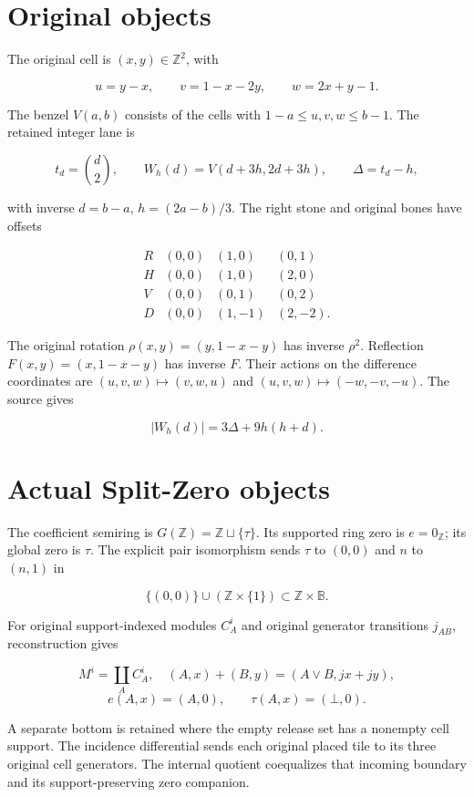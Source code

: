 \documentclass[
  10pt,
]{scrreprt}
\begin{document}
\section{Original objects}\label{original-objects}

The original cell is \((x,y)\in\mathbb Z^2\), with

\[u=y-x,\qquad v=1-x-2y,\qquad w=2x+y-1.\]

The benzel \(V(a,b)\) consists of the cells with
\(1-a\le u,v,w\le b-1\). The retained integer lane is

\[t_d=\binom d2,\qquad W_h(d)=V(d+3h,2d+3h),\qquad\Delta=t_d-h,\]

with inverse \(d=b-a\), \(h=(2a-b)/3\). The right stone and original
bones have offsets

\[\begin{array}{c|ccc}
R&(0,0)&(1,0)&(0,1)\\
H&(0,0)&(1,0)&(2,0)\\
V&(0,0)&(0,1)&(0,2)\\
D&(0,0)&(1,-1)&(2,-2).
\end{array}\]

The original rotation \(\rho(x,y)=(y,1-x-y)\) has inverse \(\rho^2\).
Reflection \(F(x,y)=(x,1-x-y)\) has inverse \(F\). Their actions on the
difference coordinates are \((u,v,w)\mapsto(v,w,u)\) and
\((u,v,w)\mapsto(-w,-v,-u)\). The source gives

\[|W_h(d)|=3\Delta+9h(h+d).\]

\section{Actual Split-Zero objects}\label{actual-split-zero-objects}

The coefficient semiring is \(G(\mathbb Z)=\mathbb Z\sqcup\{\tau\}\).
Its supported ring zero is \(e=0_{\mathbb Z}\); its global zero is
\(\tau\). The explicit pair isomorphism sends \(\tau\) to \((0,0)\) and
\(n\) to \((n,1)\) in

\[\{(0,0)\}\cup(\mathbb Z\times\{1\})\subset\mathbb Z\times\mathbb B.\]

For original support-indexed modules \(C_A^i\) and original generator
transitions \(j_{AB}\), reconstruction gives

\[M^i=\coprod_A C_A^i,\quad (A,x)+(B,y)=(A\vee B,jx+jy),\]
\[e(A,x)=(A,0),\qquad\tau(A,x)=(\bot,0).\]

A separate bottom is retained where the empty release set has a nonempty
cell support. The incidence differential sends each original placed tile
to its three original cell generators. The internal quotient coequalizes
that incoming boundary and its support-preserving zero companion.
\end{document}
